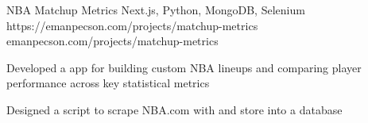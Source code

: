 
\projheader
{NBA Matchup Metrics}
{Next.js, Python, MongoDB, Selenium}
{https://emanpecson.com/projects/matchup-metrics}
{emanpecson.com/projects/matchup-metrics}

\begin{bullets}
	\item Developed a  app for building custom NBA lineups and comparing player performance across key statistical metrics

	\item Designed a  script to scrape NBA.com with  and store  into a  database
	


\end{bullets}
